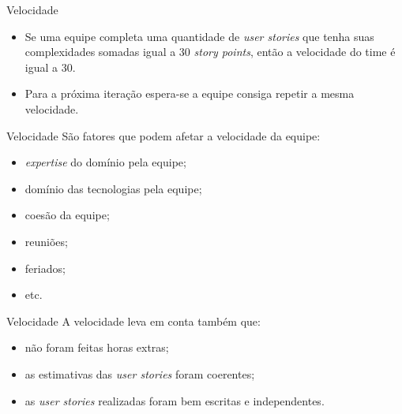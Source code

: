 \documentclass[11pt]{beamer}
\begin{document}
    \begin{frame}{Velocidade}
        \begin{itemize}
            \item Se uma equipe completa uma quantidade de \textit{user stories} que tenha suas complexidades somadas igual a 30 \textit{story points}, então a velocidade do time é igual a 30.
            \item Para a próxima iteração espera-se a equipe consiga repetir a mesma velocidade.
        \end{itemize}
    \end{frame}

    \begin{frame}{Velocidade}
        São fatores que podem afetar a velocidade da equipe:
        \begin{itemize}
            \item \textit{expertise} do domínio pela equipe;
            \item domínio das tecnologias pela equipe;
            \item coesão da equipe;
            \item reuniões;
            \item feriados;
            \item etc.
        \end{itemize}
    \end{frame}

    \begin{frame}{Velocidade}
        A velocidade leva em conta também que:
        \begin{itemize}
            \item não foram feitas horas extras;
            \item as estimativas das \textit{user stories} foram coerentes;
            \item as \textit{user stories} realizadas foram bem escritas e independentes.
        \end{itemize}
    \end{frame}
\end{document}
